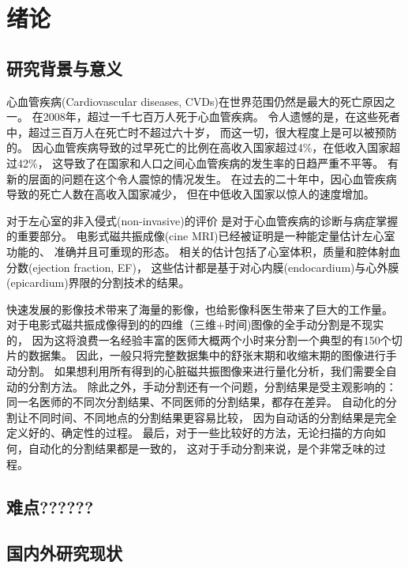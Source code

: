 
\chapter{绪论}


\section{研究背景与意义}

心血管疾病(Cardiovascular diseases, CVDs)在世界范围仍然是最大的死亡原因之一。
在2008年，超过一千七百万人死于心血管疾病。
令人遗憾的是，在这些死者中，超过三百万人在死亡时不超过六十岁，
而这一切，很大程度上是可以被预防的。
因心血管疾病导致的过早死亡的比例在高收入国家超过4\%，在低收入国家超过42\%，
这导致了在国家和人口之间心血管疾病的发生率的日趋严重不平等。
有新的层面的问题在这个令人震惊的情况发生。
在过去的二十年中，因心血管疾病导致的死亡人数在高收入国家减少，
但在中低收入国家以惊人的速度增加。

对于左心室的非入侵式(non-invasive)的评价
是对于心血管疾病的诊断与病症掌握的重要部分。
电影式磁共振成像(cine MRI)已经被证明是一种能定量估计左心室功能的、
准确并且可重现的形态。
相关的估计包括了心室体积，质量和腔体射血分数(ejection fraction, EF)，
这些估计都是基于对心内膜(endocardium)与心外膜(epicardium)界限的分割技术的结果。

快速发展的影像技术带来了海量的影像，也给影像科医生带来了巨大的工作量。
对于电影式磁共振成像得到的的四维（三维$+$时间)图像的全手动分割是不现实的，
因为这将浪费一名经验丰富的医师大概两个小时来分割一个典型的有150个切片的数据集。
因此，一般只将完整数据集中的舒张末期和收缩末期的图像进行手动分割。
如果想利用所有得到的心脏磁共振图像来进行量化分析，我们需要全自动的分割方法。
除此之外，手动分割还有一个问题，分割结果是受主观影响的：
同一名医师的不同次分割结果、不同医师的分割结果，都存在差异。
自动化的分割让不同时间、不同地点的分割结果更容易比较，
因为自动话的分割结果是完全定义好的、确定性的过程。
最后，对于一些比较好的方法，无论扫描的方向如何，自动化的分割结果都是一致的，
这对于手动分割来说，是个非常乏味的过程。

\section{难点??????}
\section{国内外研究现状}



